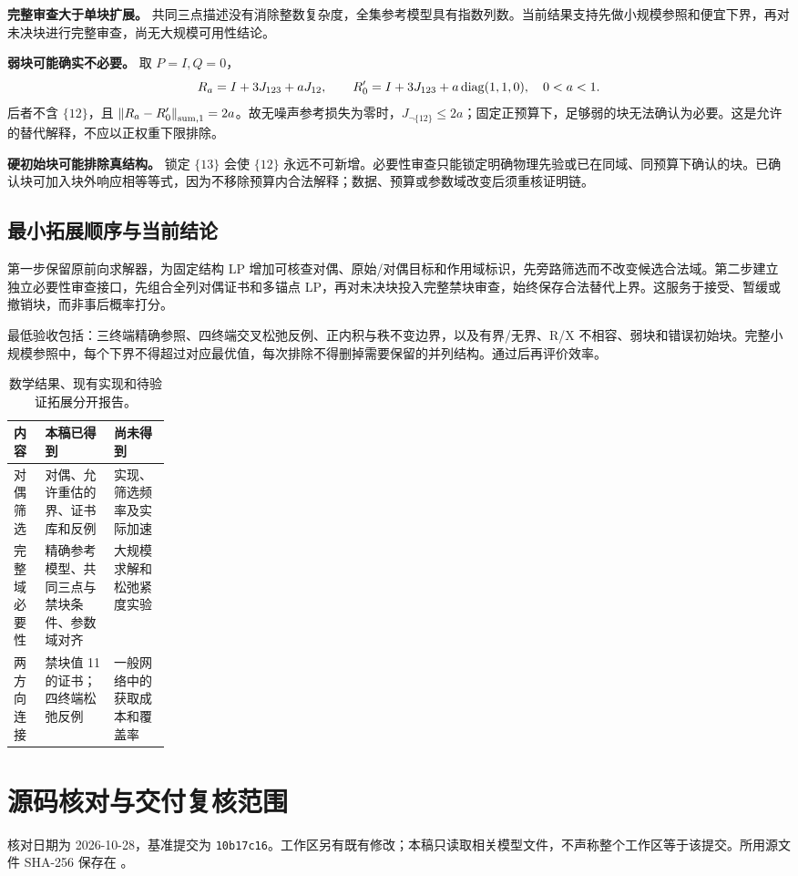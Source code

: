 \textbf{完整审查大于单块扩展。} 共同三点描述没有消除整数复杂度，全集参考模型具有指数列数。当前结果支持先做小规模参照和便宜下界，再对未决块进行完整审查，尚无大规模可用性结论。

\textbf{弱块可能确实不必要。} 取 $P=I,Q=0$，
\[
 R_a=I+3J_{123}+aJ_{12},\qquad
 R'_0=I+3J_{123}+a\operatorname{diag}(1,1,0),\quad 0<a<1.
\]
后者不含 $\{12\}$，且 $\left\lVert R_a-R'_0\right\rVert_{\mathrm{sum},1}=2a$。故无噪声参考损失为零时，$J_{\neg\{12\}}\le2a$；固定正预算下，足够弱的块无法确认为必要。这是允许的替代解释，不应以正权重下限排除。

\textbf{硬初始块可能排除真结构。} 锁定 $\{13\}$ 会使 $\{12\}$ 永远不可新增。必要性审查只能锁定明确物理先验或已在同域、同预算下确认的块。已确认块可加入块外响应相等等式，因为不移除预算内合法解释；数据、预算或参数域改变后须重核证明链。

\subsection{最小拓展顺序与当前结论}
第一步保留原前向求解器，为固定结构 LP 增加可核查对偶、原始/对偶目标和作用域标识，先旁路筛选而不改变候选合法域。第二步建立独立必要性审查接口，先组合全列对偶证书和多锚点 LP，再对未决块投入完整禁块审查，始终保存合法替代上界。这服务于接受、暂缓或撤销块，而非事后概率打分。

最低验收包括：三终端精确参照、四终端交叉松弛反例、正内积与秩不变边界，以及有界/无界、R/X 不相容、弱块和错误初始块。完整小规模参照中，每个下界不得超过对应最优值，每次排除不得删掉需要保留的并列结构。通过后再评价效率。

\begin{table}[htbp]
\centering\small
\begin{tabularx}{\linewidth}{@{}p{0.2\linewidth}XX@{}}
\toprule
内容 & 本稿已得到 & 尚未得到\\
\midrule
对偶筛选 & 对偶、允许重估的界、证书库和反例 & 实现、筛选频率及实际加速\\
完整域必要性 & 精确参考模型、共同三点与禁块条件、参数域对齐 & 大规模求解和松弛紧度实验\\
两方向连接 & 禁块值 11 的证书；四终端松弛反例 & 一般网络中的获取成本和覆盖率\\
\bottomrule
\end{tabularx}
\caption{数学结果、现有实现和待验证拓展分开报告。}
\end{table}


\appendix
\section{源码核对与交付复核范围}
\label{app:source}
核对日期为 2026-10-28，基准提交为 \texttt{10b17c16}。工作区另有既有修改；本稿只读取相关模型文件，不声称整个工作区等于该提交。所用源文件 SHA-256 保存在 。

